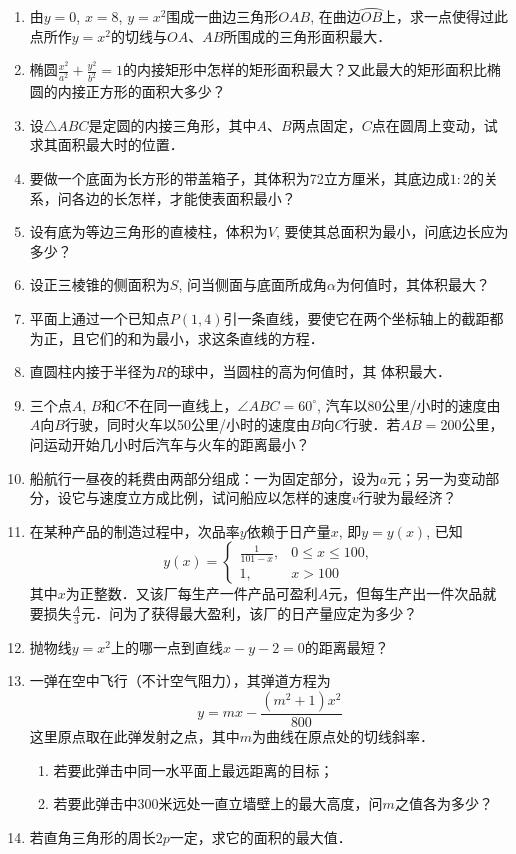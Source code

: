 \begin{ex}
\begin{enumerate}
    \item 由$y=0$, $x=8$, $y=x^2$围成一曲边三角形$OAB$, 在曲边$\wideparen{OB}$上，求一点使得过此点所作$y=x^2$的切线与$OA$、$AB$所围成的三角形面积最大．
    \item 椭圆$\frac{x^2}{a^2}+\frac{y^2}{b^2}=1$的内接矩形中怎样的矩形面积最大？又此最大的矩形面积比椭圆的内接正方形的面积大多少？
    \item 设$\triangle ABC$是定圆的内接三角形，其中$A$、$B$两点固定，$C$点在圆周上变动，试求其面积最大时的位置．
    \item 要做一个底面为长方形的带盖箱子，其体积为72立方厘米，其底边成$1:2$的关系，问各边的长怎样，才能使表面积最小？
    \item 设有底为等边三角形的直棱柱，体积为$V$, 要使其总面积为最小，问底边长应为多少？
    \item 设正三棱锥的侧面积为$S$, 问当侧面与底面所成角$\alpha$为何值时，其体积最大？
    \item 平面上通过一个已知点$P(1, 4)$引一条直线，要使它在两个坐标轴上的截距都为正，且它们的和为最小，求这条直线的方程．
    \item 直圆柱内接于半径为$R$的球中，当圆柱的高为何值时，其
    体积最大．
    \item 三个点$A$, $B$和$C$不在同一直线上，$\angle ABC=60^{\circ}$, 汽车以80公里/小时的速度由$A$向$B$行驶，同时火车以50公里/小时的速度由$B$向$C$行驶．若$AB=200$公里，问运动开始几小时后汽车与火车的距离最小？
    \item 船航行一昼夜的耗费由两部分组成：一为固定部分，设为$a$元；另一为变动部分，设它与速度立方成比例，试问船应以怎样的速度$v$行驶为最经济？
    \item 在某种产品的制造过程中，次品率$y$依赖于日产量$x$, 即$y=y(x)$, 已知
\[y(x)=\begin{cases}
    \frac{1}{101-x},& 0\le x\le 100,\\
    1,& x>100
\end{cases}\]
其中$x$为正整数．又该厂每生产一件产品可盈利$A$元，但每生产出一件次品就要损失$\frac{A}{3}$元．问为了获得最大盈利，该厂的日产量应定为多少？
\item 抛物线$y=x^2$上的哪一点到直线$x-y-2=0$的距离最短？\item 一弹在空中飞行（不计空气阻力），其弹道方程为
\[y=mx-\frac{(m^2+1)x^2}{800}\]
这里原点取在此弹发射之点，其中$m$为曲线在原点处的切线斜率．
\begin{enumerate}
    \item 若要此弹击中同一水平面上最远距离的目标；
    \item 若要此弹击中300米远处一直立墙壁上的最大高度，问$m$之值各为多少？
\end{enumerate}
\item 若直角三角形的周长$2p$一定，求它的面积的最大值．
\end{enumerate}  
\end{ex}

